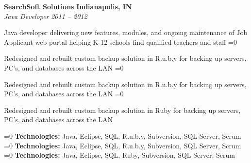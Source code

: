 %
    \headerrow
        {\textbf{\href{http://www.searchsoft.net/}{SearchSoft Solutions}}}
        {\textbf{Indianapolis, IN}}
    \\
    \headerrow
        {\emph{Java Developer}}
        {\emph{2011 -- 2012}}
    \begin{itemize*}
        \item Java developer delivering new features, modules, and ongoing maintenance of Job Applicant web portal
            helping K-12 schools find qualified teachers and staff
        \ifnum{}=0
            \item Redesigned and rebuilt custom backup solution in R.u.b.y for backing up servers, PC's, and databases across the LAN
        \fi
        \ifnum{}=0
            \item Redesigned and rebuilt custom backup solution in R.u.b.y for backing up servers, PC's, and databases across the LAN
        \fi
        \ifnum{}=0
            \item Redesigned and rebuilt custom backup solution in Ruby for backing up servers, PC's, and databases across the LAN
        \fi
    \end{itemize*}


    \ifnum{}=0
        \hspace{1.0em}
        {\textbf{Technologies:} Java, Eclipse, SQL, R.u.b.y, Subversion, SQL Server, Scrum}
    \fi
    \ifnum{}=0
        \hspace{1.0em}
        {\textbf{Technologies:} Java, Eclipse, SQL, R.u.b.y, Subversion, SQL Server, Scrum}
    \fi
    \ifnum{}=0
        \hspace{1.0em}
        {\textbf{Technologies:} Java, Eclipse, SQL, Ruby, Subversion, SQL Server, Scrum}
    \fi
